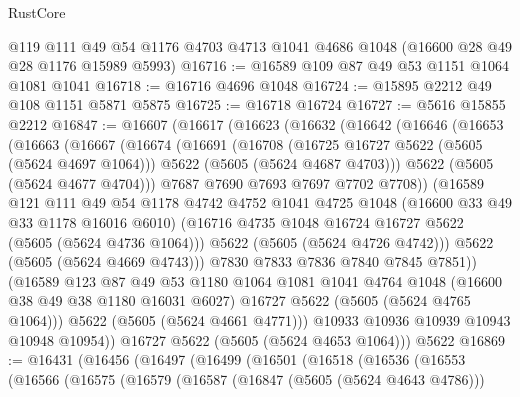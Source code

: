 \begin{lexlean}{RustCore}
\begin{coremodule}
    @119
    @111
    @49
    @54
    @1176
    @4703
    @4713
    @1041
    @4686
    @1048
    (@16600 @28 @49 @28 @1176 @15989 @5993)
@16716 := @16589 @109 @87 @49 @53 @1151 @1064 @1081 @1041
@16718 := @16716 @4696 @1048
@16724 := @15895 @2212 @49 @108 @1151 @5871 @5875
@16725 := @16718 @16724
@16727 := @5616 @15855 @2212
@16847 := @16607
    (@16617
      (@16623
        (@16632
          (@16642
            (@16646
              (@16653
                (@16663
                  (@16667
                    (@16674
                      (@16691
                        (@16708
                          (@16725 @16727 @5622 (@5605 (@5624 @4697 @1064)))
                          @5622
                          (@5605 (@5624 @4687 @4703)))
                        @5622
                        (@5605 (@5624 @4677 @4704)))
                      @7687
                      @7690
                      @7693
                      @7697
                      @7702
                      @7708))
                  (@16589
                    @121
                    @111
                    @49
                    @54
                    @1178
                    @4742
                    @4752
                    @1041
                    @4725
                    @1048
                    (@16600 @33 @49 @33 @1178 @16016 @6010)
                    (@16716 @4735 @1048 @16724 @16727 @5622 (@5605 (@5624 @4736 @1064)))
                    @5622
                    (@5605 (@5624 @4726 @4742)))
                  @5622
                  (@5605 (@5624 @4669 @4743)))
                @7830
                @7833
                @7836
                @7840
                @7845
                @7851))
            (@16589
              @123
              @87
              @49
              @53
              @1180
              @1064
              @1081
              @1041
              @4764
              @1048
              (@16600 @38 @49 @38 @1180 @16031 @6027)
              @16727
              @5622
              (@5605 (@5624 @4765 @1064)))
            @5622
            (@5605 (@5624 @4661 @4771)))
          @10933
          @10936
          @10939
          @10943
          @10948
          @10954))
      @16727
      @5622
      (@5605 (@5624 @4653 @1064)))
    @5622
@16869 := @16431
    (@16456
      (@16497
        (@16499
          (@16501
            (@16518
              (@16536
                (@16553
                  (@16566
                    (@16575
                      (@16579
                        (@16587
                          (@16847 (@5605 (@5624 @4643 @4786)))

\end{coremodule}
\end{lexlean}
